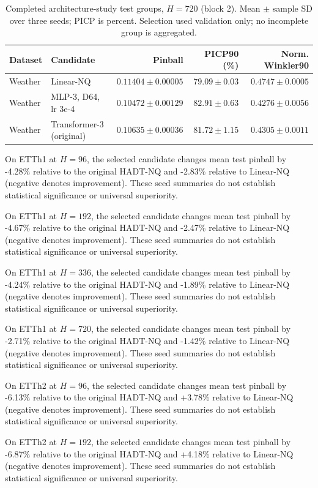 \begin{table}[t]
\centering\small
\caption{Completed architecture-study test groups, $H=720$ (block 2). Mean $\pm$ sample SD over three seeds; PICP is percent. Selection used validation only; no incomplete group is aggregated.}
\label{tab:architecture-test-720-1}
\begin{tabular}{@{}llrrr@{}}
\toprule
Dataset & Candidate & Pinball & PICP90 (\%) & Norm. Winkler90 \\
\midrule
Weather & Linear-NQ & $0.11404\pm0.00005$ & $79.09\pm0.03$ & $0.4747\pm0.0005$ \\
Weather & MLP-3, D64, lr 3e-4 & $0.10472\pm0.00129$ & $82.91\pm0.63$ & $0.4276\pm0.0056$ \\
Weather & Transformer-3 (original) & $0.10635\pm0.00036$ & $81.72\pm1.15$ & $0.4305\pm0.0011$ \\
\bottomrule
\end{tabular}
\end{table}


On ETTh1 at $H=96$, the selected candidate changes mean test pinball by -4.28\% relative to the original HADT-NQ and -2.83\% relative to Linear-NQ (negative denotes improvement). These seed summaries do not establish statistical significance or universal superiority.

On ETTh1 at $H=192$, the selected candidate changes mean test pinball by -4.67\% relative to the original HADT-NQ and -2.47\% relative to Linear-NQ (negative denotes improvement). These seed summaries do not establish statistical significance or universal superiority.

On ETTh1 at $H=336$, the selected candidate changes mean test pinball by -4.24\% relative to the original HADT-NQ and -1.89\% relative to Linear-NQ (negative denotes improvement). These seed summaries do not establish statistical significance or universal superiority.

On ETTh1 at $H=720$, the selected candidate changes mean test pinball by -2.71\% relative to the original HADT-NQ and -1.42\% relative to Linear-NQ (negative denotes improvement). These seed summaries do not establish statistical significance or universal superiority.

On ETTh2 at $H=96$, the selected candidate changes mean test pinball by -6.13\% relative to the original HADT-NQ and +3.78\% relative to Linear-NQ (negative denotes improvement). These seed summaries do not establish statistical significance or universal superiority.

On ETTh2 at $H=192$, the selected candidate changes mean test pinball by -6.87\% relative to the original HADT-NQ and +4.18\% relative to Linear-NQ (negative denotes improvement). These seed summaries do not establish statistical significance or universal superiority.

